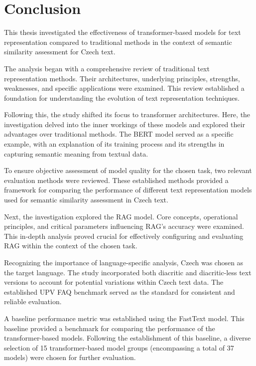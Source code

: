 
\chapter{Conclusion \label{chap:conclusion}}

This thesis investigated the effectiveness of transformer-based models for text representation compared to traditional methods in the context of semantic similarity assessment for Czech text.

The analysis began with a comprehensive review of traditional text representation methods.
Their architectures, underlying principles, strengths, weaknesses, and specific applications were examined.
This review established a foundation for understanding the evolution of text representation techniques.

Following this, the study shifted its focus to transformer architectures.
Here, the investigation delved into the inner workings of these models and explored their advantages over traditional methods.
The \ac{BERT} model served as a specific example, with an explanation of its training process and its strengths in capturing semantic meaning from textual data.

To ensure objective assessment of model quality for the chosen task, two relevant evaluation methods were reviewed.
These established methods provided a framework for comparing the performance of different text representation models used for semantic similarity assessment in Czech text.

Next, the investigation explored the \ac{RAG} model.
Core concepts, operational principles, and critical parameters influencing \ac{RAG}'s accuracy were examined.
This in-depth analysis proved crucial for effectively configuring and evaluating \ac{RAG} within the context of the chosen task.

Recognizing the importance of language-specific analysis, Czech was chosen as the target language.
The study incorporated both diacritic and diacritic-less text versions to account for potential variations within Czech text data.
The established UPV FAQ benchmark served as the standard for consistent and reliable evaluation.

A baseline performance metric was established using the FastText model.
This baseline provided a benchmark for comparing the performance of the transformer-based models.
Following the establishment of this baseline, a diverse selection of 15 transformer-based model groups (encompassing a total of 37 models) were chosen for further evaluation.

